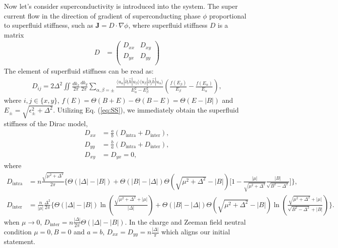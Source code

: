 \documentclass{article}
\begin{document}
Now let's consider superconductivity is introduced into the system. The super current flow in the direction of gradient of superconducting phase $ \phi $ proportional to superfluid stiffness, such as $ \mathbf{J}=D \cdot \nabla \phi$, where superfluid stiffness $ D $ is a matrix
\begin{align}
    D & = \left(\begin{array}{cc}
        D_{xx}  & D_{xy}    \\
        D_{yx}  & D_{yy}   \\
    \end{array}\right)
\end{align}
The element of superfluid stiffness can be read as:
\begin{align}
    D_{ij} = 2\Delta^2 \iint \frac{dk_x}{2\pi} \frac{dk_y}{2\pi} \sum_{\alpha,\beta=\pm} \frac{\langle u_{\alpha}|\partial_{i} \hat{h}|u_{\beta}\rangle\langle u_{\beta}|\partial_{j} \hat{h}|u_{\alpha}\rangle}{E_\alpha^2 - E_\beta^2} \left(\frac{f(E_\beta)}{E_\beta} - \frac{f(E_\alpha)}{E_\alpha} \right),\label{eq:SS}
\end{align} 
where $ i,j \in \{x,y\} $, $ f(E) = \Theta(B+E)-\Theta(B-E)=\Theta(E-\left\vert B \right\vert ) $ and $ E_\pm = \sqrt{\epsilon_\pm^2 + \Delta^2}  $. Utilizing Eq. (\ref{eq:SS}), we immediately obtain the superfluid stiffness of the Dirac model,
\begin{align}
    D_{xx}  &=\frac{a}{b} (D_{\textrm{intra}} + D_{\textrm{inter}}),\\ \label{eq:Dxx }
    D_{yy}  &=\frac{b}{a} (D_{\textrm{intra}} + D_{\textrm{inter}}),\\ \label{eq:Dyy }
    D_{xy} &= D_{yx} = 0,
\end{align}
where
\begin{align*}
    D_{\textrm{intra}} &=  n \frac{\sqrt{\mu^2+\Delta^2}}{2\pi}\Bigg\{ \Theta(|\Delta|-|B|)+\Theta(|B|-|\Delta|)\Theta(\sqrt{\mu^2+\Delta^2}-|B|) \bigg[1-\frac{|\mu|}{\sqrt{\mu^2+\Delta^2}}\frac{|B|}{\sqrt{B^2-\Delta^2}}\bigg]\Bigg\},\\
    D_{\textrm{inter}} &= \frac{n}{|\mu|}\frac{\Delta^2}{2\pi} \Bigg\{ \Theta(|\Delta|-|B|)\ln(\frac{\sqrt{\mu^2+\Delta^2}+|\mu|}{|\Delta|})+\Theta(|B|-|\Delta|)\Theta(\sqrt{\mu^2+\Delta^2}-|B|)\ln(\frac{\sqrt{\mu^2+\Delta^2}+|\mu|}{\sqrt{B^2-\Delta^2}+|B|}) \Bigg\}.    
\end{align*}
when $\mu \to 0$, $D_{\textrm{inter}}=n\frac{|\Delta|}{2\pi}\Theta(|\Delta|-|B|) $. In the charge and Zeeman field neutral condition $ \mu=0,B=0 $ and $ a=b $, $ D_{xx}=D_{yy} = n \frac{\left\vert \Delta \right\vert}{\pi}     $ which aligns our initial statement. 
\end{document}
